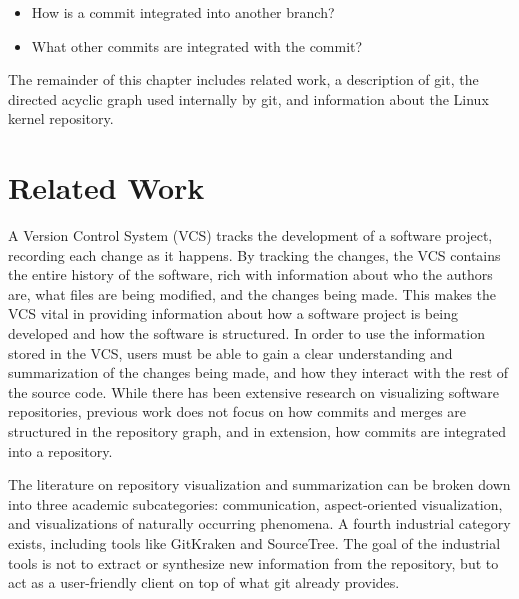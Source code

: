\begin{textbox}
\begin{itemize}
  \item How is a commit integrated into another branch?
  \item What other commits are integrated with the commit?
\end{itemize}
\end{textbox}

The remainder of this chapter includes related work, a description of
git, the directed acyclic graph used internally by git, and information
about the Linux kernel repository.

\section{Related Work}\label{sec:related_work}

A Version Control System (VCS) tracks the development of a software project,
recording each change as it happens. By tracking the changes, the VCS
contains the entire history of the software, rich with information about
who the authors are, what files are being modified, and the changes
being made.
This makes the VCS vital in providing information about
how a software project is being developed and how the software is
structured. In order to use the information stored in the VCS, users
must be able to gain a clear understanding and summarization of the
changes being made, and how they interact with the rest of the source
code. While there has been extensive research on visualizing software
repositories, previous work does not focus on how commits and merges are
structured in the repository graph, and in extension, how commits are
integrated into a repository.

The literature on repository visualization
and summarization can be broken down into three academic subcategories:
communication\cite{Cubranic2005,Begel2010}, aspect-oriented
visualization\cite{Ambros2005,Burch2005,Ambros2009}, and visualizations of naturally occurring phenomena\cite{ogawa09,Caudwell2010}.
A fourth industrial category exists, including tools like GitKraken and
SourceTree.
The goal of the industrial tools is not to extract or synthesize new
information from the repository, but to act as a user-friendly client
on top of what git already provides.

